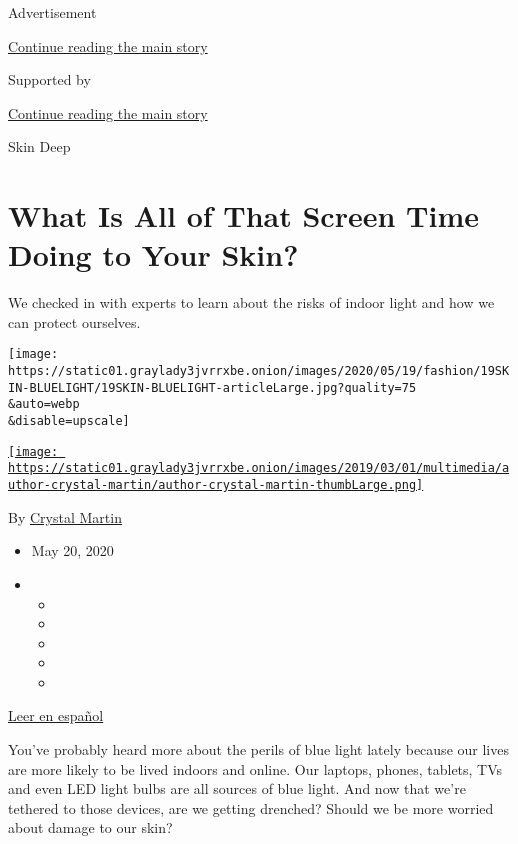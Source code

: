 Advertisement

\protect\hyperlink{after-top}{Continue reading the main story}

Supported by

\protect\hyperlink{after-sponsor}{Continue reading the main story}

Skin Deep

\hypertarget{what-is-all-of-that-screen-time-doing-to-your-skin}{%
\section{What Is All of That Screen Time Doing to Your
Skin?}\label{what-is-all-of-that-screen-time-doing-to-your-skin}}

We checked in with experts to learn about the risks of indoor light and
how we can protect ourselves.

\texttt{[image: https://static01.graylady3jvrrxbe.onion/images/2020/05/19/fashion/19SKIN-BLUELIGHT/19SKIN-BLUELIGHT-articleLarge.jpg?quality=75\\\&auto=webp\\\&disable=upscale]}

\href{https://www.nytimes3xbfgragh.onion/by/crystal-martin}{\texttt{[image: https://static01.graylady3jvrrxbe.onion/images/2019/03/01/multimedia/author-crystal-martin/author-crystal-martin-thumbLarge.png]}}

By \href{https://www.nytimes3xbfgragh.onion/by/crystal-martin}{Crystal
Martin}

\begin{itemize}
\item
  May 20, 2020
\item
  \begin{itemize}
  \item
  \item
  \item
  \item
  \item
  \end{itemize}
\end{itemize}

\href{https://www.nytimes3xbfgragh.onion/es/2020/05/26/espanol/estilos-de-vida/efectos-luz-pantalla-piel.html}{Leer
en español}

You've probably heard more about the perils of blue light lately because
our lives are more likely to be lived indoors and online. Our laptops,
phones, tablets, TVs and even LED light bulbs are all sources of blue
light. And now that we're tethered to those devices, are we getting
drenched? Should we be more worried about damage to our skin?

